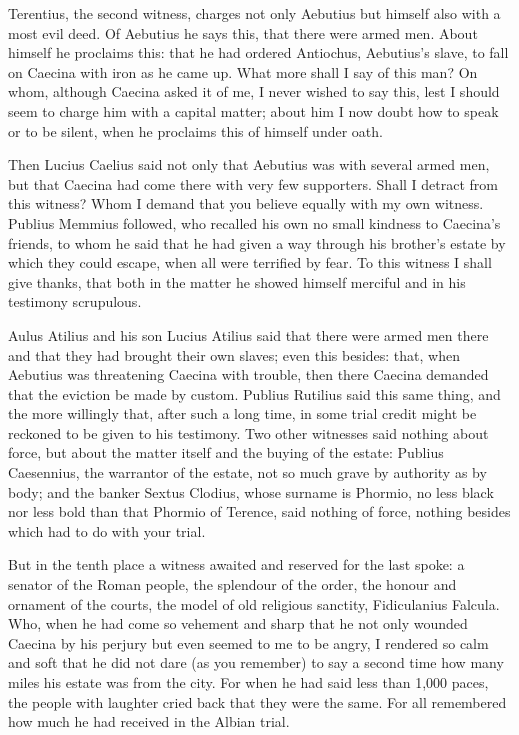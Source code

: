  Terentius, the second witness, charges not only Aebutius but himself also with a most evil deed. Of Aebutius he says this, that there were armed men. About himself he proclaims this: that he had ordered Antiochus, Aebutius's slave, to fall on Caecina with iron as he came up. What more shall I say of this man? On whom, although Caecina asked it of me, I never wished to say this, lest I should seem to charge him with a capital matter; about him I now doubt how to speak or to be silent, when he proclaims this of himself under oath.

 Then Lucius Caelius said not only that Aebutius was with several armed men, but that Caecina had come there with very few supporters. Shall I detract from this witness? Whom I demand that you believe equally with my own witness. Publius Memmius followed, who recalled his own no small kindness to Caecina's friends, to whom he said that he had given a way through his brother's estate by which they could escape, when all were terrified by fear. To this witness I shall give thanks, that both in the matter he showed himself merciful and in his testimony scrupulous.

 Aulus Atilius and his son Lucius Atilius said that there were armed men there and that they had brought their own slaves; even this besides: that, when Aebutius was threatening Caecina with trouble, then there Caecina demanded that the eviction be made by custom. Publius Rutilius said this same thing, and the more willingly that, after such a long time, in some trial credit might be reckoned to be given to his testimony. Two other witnesses said nothing about force, but about the matter itself and the buying of the estate: Publius Caesennius, the warrantor of the estate, not so much grave by authority as by body; and the banker Sextus Clodius, whose surname is Phormio, no less black nor less bold than that Phormio of Terence, said nothing of force, nothing besides which had to do with your trial.

 But in the tenth place a witness awaited and reserved for the last spoke: a senator of the Roman people, the splendour of the order, the honour and ornament of the courts, the model of old religious sanctity, Fidiculanius Falcula. Who, when he had come so vehement and sharp that he not only wounded Caecina by his perjury but even seemed to me to be angry, I rendered so calm and soft that he did not dare (as you remember) to say a second time how many miles his estate was from the city. For when he had said less than 1,000 paces, the people with laughter cried back that they were the same. For all remembered how much he had received in the Albian trial.

